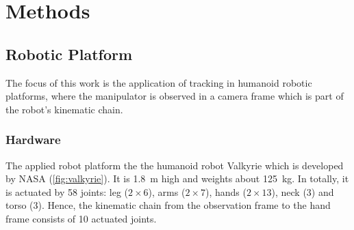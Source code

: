 \chapter{Methods}

\section{Robotic Platform}

The focus of this work is the application of tracking in humanoid robotic platforms, where the manipulator is observed in a camera frame which is part of the robot's kinematic chain.

\subsection{Hardware}

The applied robot platform the the humanoid robot Valkyrie which is developed by NASA (\cref{fig:valkyrie}). It is \SI{1.8}{\meter} high and weights about \SI{125}{\kilo\gram}. In totally, it is actuated by 58 joints: leg ($2 \times 6$), arms ($2 \times 7$), hands ($2 \times 13$), neck (3) and torso (3). Hence, the kinematic chain from the observation frame to the hand frame consists of 10 actuated joints.

